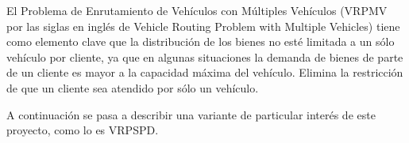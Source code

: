 El Problema de Enrutamiento de Vehículos con Múltiples Vehículos (VRPMV por las siglas en inglés de Vehicle Routing Problem with Multiple Vehicles) tiene como elemento clave que la distribución de los bienes no esté limitada a un sólo vehículo por cliente, ya que en algunas situaciones la demanda de bienes de parte de un cliente es mayor a la capacidad máxima del vehículo. Elimina la restricción de que un cliente sea atendido por sólo un vehículo.

A continuación se pasa a describir una variante de particular interés de este proyecto, como lo es VRPSPD.

%
%
%
%
